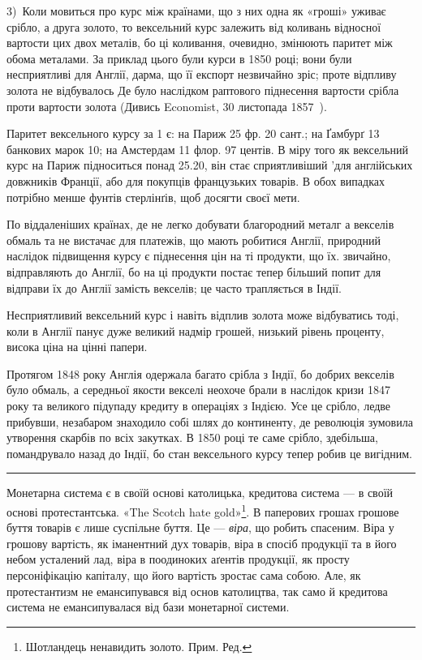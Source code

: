 
3)~Коли мовиться про курс між країнами, що з них одна як «гроші»
уживає срібло, а друга золото, то вексельний курс залежить від коливань відносної
вартости цих двох металів, бо ці коливання, очевидно, змінюють паритет
між обома металами. За приклад цього були курси в 1850 році; вони були
несприятливі для Англії, дарма, що її експорт незвичайно зріс; проте відпливу
золота не відбувалось Де було наслідком раптового піднесення вартости срібла
проти вартости золота (Дивись Economist, 30 листопада 1857~).

Паритет вексельного курсу за 1 є: на Париж 25 фр. 20 сант.; на
Ґамбурґ 13 банкових марок 10; на Амстердам 11 флор. 97 центів.
В міру того як вексельний курс на Париж підноситься понад 25.20, він стає
сприятливіший 'для англійських довжників Франції, або для покупців французьких
товарів. В обох випадках потрібно менше фунтів стерлінґів, щоб досягти
своєї мети.

По віддаленіших країнах, де не легко добувати благородний металг
а векселів обмаль та не вистачає для платежів, що мають робитися Англії,
природний наслідок підвищення курсу є піднесення цін на ті продукти, що їх.
звичайно, відправляють до Англії, бо на ці продукти постає тепер більший попит
для відправи їх до Англії замість векселів; це часто трапляється в Індії.

Несприятливий вексельний курс і навіть відплив золота може відбуватись
тоді, коли в Англії панує дуже великий надмір грошей, низький рівень проценту,
висока ціна на цінні папери.

Протягом 1848 року Англія одержала багато срібла з Індії, бо добрих
векселів було обмаль, а середньої якости векселі неохоче брали в наслідок
кризи 1847 року та великого підупаду кредиту в операціях з Індією. Усе це
срібло, ледве прибувши, незабаром знаходило собі шлях до континенту, де революція
зумовила утворення скарбів по всіх закутках. В 1850 році те саме
срібло, здебільша, помандрувало назад до Індії, бо стан вексельного курсу тепер
робив це вигідним.

\pfbreak

Монетарна система є в своїй основі католицька, кредитова система — в своїй
основі протестантська. «The Scotch hate gold»\footnote*{
Шотландець ненавидить золото. Прим. Ред.
}. В паперових грошах грошове
буття товарів є лише суспільне буття. Це — \emph{віра}, що робить спасеним. Віра
у грошову вартість, як іманентний дух товарів, віра в спосіб продукції та в його
небом усталений лад, віра в поодиноких аґентів продукції, як просту персоніфікацію
капіталу, що його вартість зростає сама собою. Але, як протестантизм
не емансипувався від основ католицтва, так само й кредитова система не емансипувалася
від бази монетарної системи.

